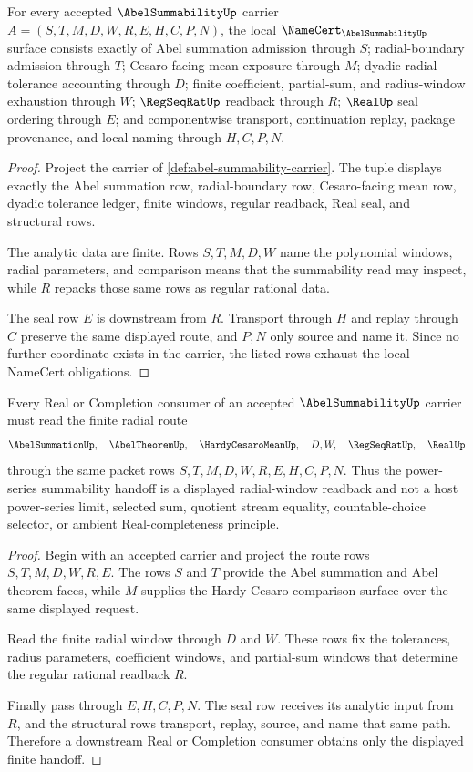\begin{theorem}
\label{thm:abel-summability-namecert-obligations}
For every accepted $\AbelSummabilityUp$ carrier $A=(S,T,M,D,W,R,E,H,C,P,N)$, the local $\NameCert_{\AbelSummabilityUp}$ surface consists exactly of Abel summation admission through $S$; radial-boundary admission through $T$; Cesaro-facing mean exposure through $M$; dyadic radial tolerance accounting through $D$; finite coefficient, partial-sum, and radius-window exhaustion through $W$; $\RegSeqRatUp$ readback through $R$; $\RealUp$ seal ordering through $E$; and componentwise transport, continuation replay, package provenance, and local naming through $H,C,P,N$.
\end{theorem}
\begin{proof}
Project the carrier of \autoref{def:abel-summability-carrier}. The tuple displays exactly the Abel summation row, radial-boundary row, Cesaro-facing mean row, dyadic tolerance ledger, finite windows, regular readback, Real seal, and structural rows.

The analytic data are finite. Rows $S,T,M,D,W$ name the polynomial windows, radial parameters, and comparison means that the summability read may inspect, while $R$ repacks those same rows as regular rational data.

The seal row $E$ is downstream from $R$. Transport through $H$ and replay through $C$ preserve the same displayed route, and $P,N$ only source and name it. Since no further coordinate exists in the carrier, the listed rows exhaust the local NameCert obligations.
\end{proof}

\begin{theorem}
\label{thm:abel-summability-power-series-handoff}
Every Real or Completion consumer of an accepted $\AbelSummabilityUp$ carrier must read the finite radial route
$$
\AbelSummationUp,\quad \AbelTheoremUp,\quad \HardyCesaroMeanUp,\quad D,W,\quad \RegSeqRatUp,\quad \RealUp
$$
through the same packet rows $S,T,M,D,W,R,E,H,C,P,N$. Thus the power-series summability handoff is a displayed radial-window readback and not a host power-series limit, selected sum, quotient stream equality, countable-choice selector, or ambient Real-completeness principle.
\end{theorem}
\begin{proof}
Begin with an accepted carrier and project the route rows $S,T,M,D,W,R,E$. The rows $S$ and $T$ provide the Abel summation and Abel theorem faces, while $M$ supplies the Hardy-Cesaro comparison surface over the same displayed request.

Read the finite radial window through $D$ and $W$. These rows fix the tolerances, radius parameters, coefficient windows, and partial-sum windows that determine the regular rational readback $R$.

Finally pass through $E,H,C,P,N$. The seal row receives its analytic input from $R$, and the structural rows transport, replay, source, and name that same path. Therefore a downstream Real or Completion consumer obtains only the displayed finite handoff.
\end{proof}

